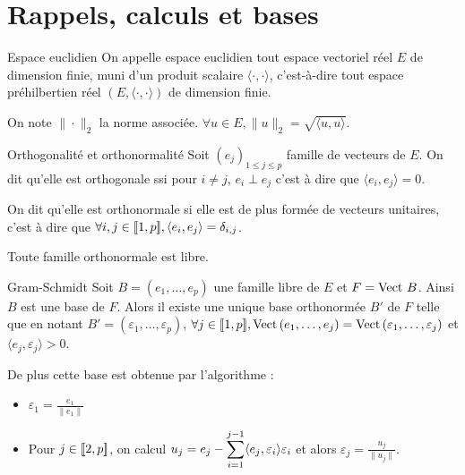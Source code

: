 \section{Rappels, calculs et bases}

\begin{definition}{Espace euclidien}{}
    On appelle espace euclidien tout espace vectoriel réel $E$ de dimension finie,
    muni d'un produit scalaire $\langle \cdot, \cdot \rangle$, c'est-à-dire tout espace 
    préhilbertien réel $(E, \langle \cdot, \cdot \rangle)$ de dimension finie.

    On note $\| \cdot \|_2$ la norme associée. $\forall u \in E, \| u \|_2 = \sqrt{\langle u, u \rangle}$.
\end{definition}

\begin{definition}{Orthogonalité et orthonormalité}{}
    Soit $(e_j)_{1 \leqslant j \leqslant p}$ famille de vecteurs de $E$.
    On dit qu'elle est orthogonale ssi pour $i \neq j$, $e_i \perp e_j$ c'est à dire 
    que $\langle e_i, e_j \rangle = 0$.

    On dit qu'elle est orthonormale si elle est de plus formée de vecteurs unitaires,
    c'est à dire que $\forall i, j \in [\![1, p]\!], \langle e_i, e_j \rangle = \delta_{i,j}$.

    Toute famille orthonormale est libre. 
\end{definition}

\begin{theoreme}{Gram-Schmidt}{}
    Soit $B = (e_1, \dots, e_p)$ une famille libre de $E$ et $F = \operatorname{Vect} \, B$. 
    Ainsi $B$ est une base de $F$. Alors il existe une unique base orthonormée 
    $B'$ de $F$ telle que en notant $B' = (\varepsilon_1, \dots, \varepsilon_p)$,
    $\forall j \in [\![1, p]\!], \operatorname{Vect} \,(e_1, \dots, e_j) = \operatorname{Vect} \,(\varepsilon_1, \dots, \varepsilon_j)$
    et $\langle e_j , \varepsilon_j \rangle > 0$.

    De plus cette base est obtenue par l'algorithme : 
    \begin{itemize}
        \item $\varepsilon_1 = \frac{e_1}{\| e_1 \|} $
        \item Pour $j \in [\![2, p]\!]$, on calcul $u_j = e_j - \displaystyle \sum_{i = 1}^{j - 1} \langle e_j, \varepsilon_i \rangle \varepsilon_i$
        et alors $\varepsilon_j = \frac{u_j}{\| u_j \|}$.
    \end{itemize}
\end{theoreme}

